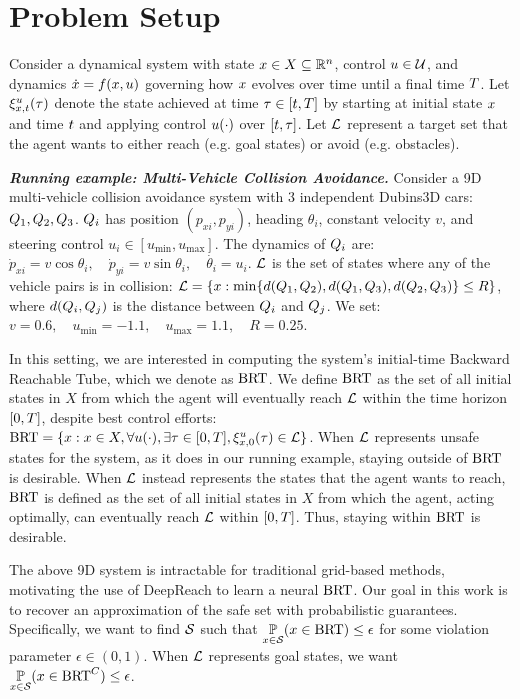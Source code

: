 \section{Problem Setup} \label{sec:problem_setup}
\vspace{-0.5em}
Consider a dynamical system with state $x \in X \subseteq \mathbb{R}^n$, control $u \in \mathcal{U}$, and dynamics $\dot{x} = f(x, u)$ governing how $x$ evolves over time until a final time $T$. 
Let $\xi_{x,t}^{u}(\tau)$ denote the state achieved at time $\tau \in [t, T]$ by starting at initial state $x$ and time $t$ and applying control $u(\cdot)$ over $[t,\tau]$. 
Let $\mathcal{L}$ represent a target set that the agent wants to either reach (e.g. goal states) or avoid (e.g. obstacles).
\vspace{0.2em}

\noindent \textit{\textbf{Running example: Multi-Vehicle Collision Avoidance.}}
Consider a 9D multi-vehicle collision avoidance system with 3 independent Dubins3D cars: $Q_1, Q_2, Q_3$. 
$Q_i$ has position $(p_{xi}, p_{yi})$, heading $\theta_i$, constant velocity $v$, and steering control $u_i \in [u_{\min}, u_{\max}]$. 
The dynamics of $Q_i$ are: $\dot{p}_{xi} = v\cos{\theta_i}, \quad \dot{p}_{yi} = v\sin{\theta_i}, \quad \dot{\theta_i} = u_i$.
$\mathcal{L}$ is the set of states where any of the vehicle pairs is in collision: $\mathcal{L} = \{x: \min\{d(Q_1, Q_2), d(Q_1, Q_3), d(Q_2, Q_3)\} \le R\}$, where $d(Q_i, Q_j)$ is the distance between $Q_i$ and $Q_j$.
We set: $v=0.6, \quad u_{\min}=-1.1, \quad u_{\max}=1.1, \quad R=0.25$.

In this setting, we are interested in computing the system's initial-time Backward Reachable Tube, which we denote as $\text{BRT}$. 
We define $\text{BRT}$ as the set of all initial states in $X$ from which the agent will eventually reach $\mathcal{L}$ within the time horizon $[0,T]$, despite best control efforts: $\text{BRT} = \{x: x\in X, \forall u(\cdot), \exists \tau \in [0, T], \xi_{x,0}^{u}(\tau) \in \mathcal{L}\}$.
When $\mathcal{L}$ represents unsafe states for the system, as it does in our running example, staying outside of $\text{BRT}$ is desirable. 
When $\mathcal{L}$ instead represents the states that the agent wants to reach, $\text{BRT}$ is defined as the set of all initial states in $X$ from which the agent, acting optimally, can eventually reach $\mathcal{L}$ within $[0,T]$. Thus, staying within $\text{BRT}$ is desirable.

The above 9D system is intractable for traditional grid-based methods, motivating the use of DeepReach to learn a neural $\text{BRT}$.
Our goal in this work is to recover an approximation of the safe set with probabilistic guarantees.
Specifically, we want to find $\mathcal{S}$ such that $\underset{x \in \mathcal{S}}{\mathbb{P}} ( x \in \text{BRT} ) \le \epsilon$ for some violation parameter $\epsilon \in (0, 1)$.
When $\mathcal{L}$ represents goal states, we want $\underset{x \in \mathcal{S}}{\mathbb{P}} ( x \in \text{BRT}^C ) \le \epsilon$.